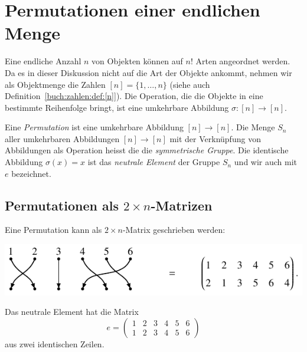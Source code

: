 %
%
%
\section{Permutationen einer endlichen Menge
\label{buch:section:permutationen-einer-endlichen-menge}}
Eine endliche Anzahl $n$ von Objekten können auf $n!$ Arten angeordnet
werden.
Da es in dieser Diskussion nicht auf die Art der Objekte ankommt,
nehmen wir als Objektmenge die Zahlen $[n] = \{ 1,\dots,n\}$
(siehe auch Definition~\ref{buch:zahlen:def:[n]}).
Die Operation, die die Objekte in eine bestimmte Reihenfolge bringt,
ist eine umkehrbare Abbildung $\sigma\colon[n]\to[n]$.

\begin{definition}
\label{buch:permutationen:def:permutation}
Eine {\em Permutation} ist eine umkehrbare Abbildung $[n]\to[n]$.
Die Menge $S_n$ aller umkehrbaren Abbildungen $[n]\to[n]$
mit der Verknüpfung von Abbildungen als Operation heisst die
die {\em symmetrische Gruppe}.
%
Die identische Abbildung $\sigma(x)=x$ ist das {\em neutrale
Element} der Gruppe $S_n$ und wir auch mit $e$ bezeichnet.
%
\end{definition}

\subsection{Permutationen als $2\times n$-Matrizen}
Eine Permutation kann als $2\times n$-Matrix geschrieben werden:
\begin{center}
\includegraphics{chapters/50-permutationen/images/permutation.pdf}
\end{center}
Das neutrale Element hat die Matrix
\[
e = \begin{pmatrix}
1&2&3&4&5&6\\
1&2&3&4&5&6
\end{pmatrix}
\]
aus zwei identischen Zeilen.

